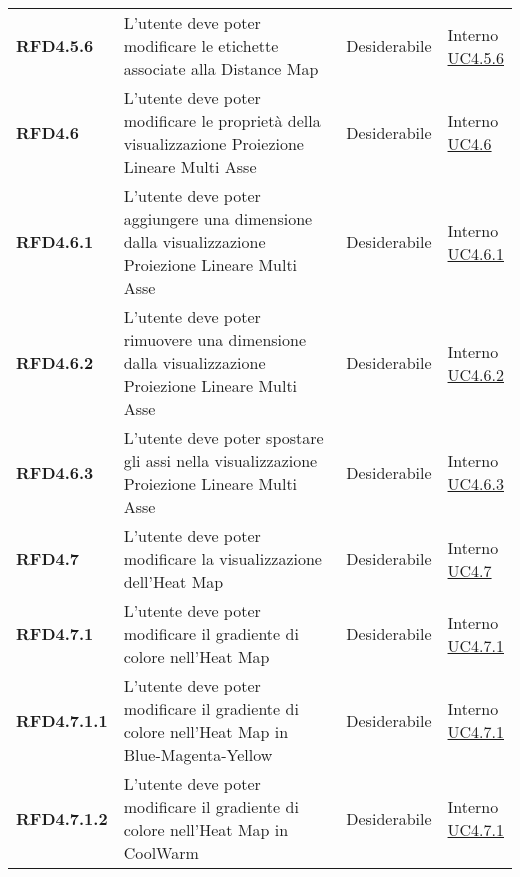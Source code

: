 \begin{longtable}[H]{>{\raggedright\bfseries}m{20mm} >{\raggedright}m{90mm} >{\raggedright}m{28mm} >{\raggedright\arraybackslash}m{30mm}}
    RFD4.5.6
    & L'utente deve poter modificare le etichette associate alla Distance Map
    & Desiderabile
    & \makecell{ Interno \\ \hyperref[par:uc4.5.6]{UC4.5.6} }\\

    RFD4.6
    & L'utente deve poter modificare le proprietà della visualizzazione Proiezione Lineare Multi Asse
    & Desiderabile
    & \makecell{ Interno \\  \hyperref[ssub:uc4.6]{UC4.6} }\\

    RFD4.6.1
    & L'utente deve poter aggiungere una dimensione dalla visualizzazione Proiezione Lineare Multi Asse
    & Desiderabile
    & \makecell{ Interno \\  \hyperref[par:uc4.6.1]{UC4.6.1} }\\

    RFD4.6.2
    & L'utente deve poter rimuovere una dimensione dalla visualizzazione Proiezione Lineare Multi Asse
    & Desiderabile
    & \makecell{ Interno \\  \hyperref[par:uc4.6.2]{UC4.6.2} }\\

    RFD4.6.3
    & L'utente deve poter spostare gli assi nella visualizzazione Proiezione Lineare Multi Asse
    & Desiderabile
    & \makecell{ Interno \\  \hyperref[par:uc4.6.3]{UC4.6.3} }\\

    RFD4.7
    & L'utente deve poter modificare la visualizzazione dell'Heat Map
    & Desiderabile
    & \makecell{ Interno \\  \hyperref[ssub:uc4.7]{UC4.7} }\\

    RFD4.7.1
    & L'utente deve poter modificare il gradiente di colore nell'Heat Map
    & Desiderabile
    & \makecell{ Interno \\  \hyperref[par:uc4.7.1]{UC4.7.1} }\\

    RFD4.7.1.1
    & L'utente deve poter modificare il gradiente di colore nell'Heat Map in Blue-Magenta-Yellow
    & Desiderabile
    & \makecell{ Interno \\  \hyperref[par:uc4.7.1]{UC4.7.1} }\\

    RFD4.7.1.2
    & L'utente deve poter modificare il gradiente di colore nell'Heat Map in CoolWarm
    & Desiderabile
    & \makecell{ Interno \\  \hyperref[par:uc4.7.1]{UC4.7.1} }\\


\end{longtable}
